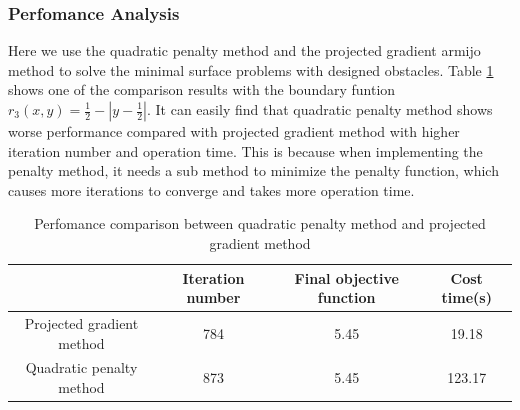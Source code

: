 \subsubsection{Perfomance Analysis}
Here we use the quadratic penalty method and the projected gradient armijo
method to solve the minimal surface problems with designed obstacles. Table \ref{tab:qua} shows one of the comparison results with the boundary funtion $ r_3(x, y)=\frac{1}{2}-\left|y-\frac{1}{2}\right|$. It can easily find that quadratic penalty method shows worse performance compared with projected gradient method with higher iteration number and operation time. This is because when implementing the penalty method, it needs a sub method to minimize the penalty function, which causes more iterations to converge and takes more operation time.
\begin{table}[!ht]
    \caption{Perfomance comparison between quadratic penalty method and projected gradient method}\label{tab:qua}
    \begin{tabular*}{\hsize}{@{}@{\extracolsep{\fill}}cccc@{}}
    \toprule
            &Iteration number  &Final objective function  &Cost time(s)  \\
    \midrule
    Projected gradient method    &784   &5.45  &19.18  \\
    Quadratic penalty method  &873   &5.45  &123.17  \\
    \bottomrule
    \end{tabular*}
\end{table}
